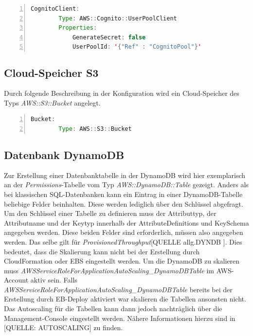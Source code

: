 \documentclass[a4paper, 12pt]{scrreprt}
\begin{document}
\begin{lstlisting}[xleftmargin=\parindent,numbers=left,numberstyle=\small,numbersep=8pt,frame=L,mathescape=true, basicstyle=\small, language=Java, lineskip={1.0pt}]
    CognitoClient:
        Type: AWS::Cognito::UserPoolClient
        Properties:
            GenerateSecret: false
            UserPoolId: '{"Ref" : "CognitoPool"}'
\end{lstlisting} 

\subsection{Cloud-Speicher S3}
Durch folgende Beschreibung in der Konfiguration wird ein Cloud-Speicher des Typs \textit{AWS::S3::Bucket} angelegt.
\begin{lstlisting}[xleftmargin=\parindent,numbers=left,numberstyle=\small,numbersep=8pt,frame=L,mathescape=true, basicstyle=\small, language=Java, lineskip={1.0pt}]
Bucket:
        Type: AWS::S3::Bucket
\end{lstlisting}          


\subsection{Datenbank DynamoDB}
Zur Erstellung einer Datenbanktabelle in der DynamoDB wird hier exemplarisch an der \textit{Permissions}-Tabelle vom Typ \textit{AWS::DynamoDB::Table} gezeigt. Anders als bei klassischen SQL-Datenbanken kann ein Eintrag in einer DynamoDB-Tabelle beliebige Felder beinhalten. Diese werden lediglich über den Schlüssel abgefragt. Um den Schlüssel einer Tabelle zu definieren muss der Attributtyp, der Attributname und der Keytyp innerhalb der AttributeDefinitions und KeySchema angegeben werden. Diese beiden Felder sind erforderlich, müssen also angegeben werden. Das selbe gilt für \textit{ProvisionedThroughput}[QUELLE allg.DYNDB ].
Dies bedeutet, dass die Skalierung kann nicht bei der Erstellung durch CloudFormation oder EBS eingestellt werden. Um die DynamoDB zu skalieren muss \textit{AWSServiceRoleForApplicationAutoScaling\_DynamoDBTable} im AWS-Account aktiv sein. Falls \textit{AWSServiceRoleForApplicationAutoScaling\_DynamoDBTable} bereits bei der Erstellung durch EB-Deploy aktiviert war skalieren die Tabellen ansonsten nicht. Das Autoscaling für die Tabellen kann dann jedoch nachträglich über die Management-Console eingestellt werden. Nähere Informationen hierzu sind in [QUELLE: AUTOSCALING] zu finden.

\end{document}
